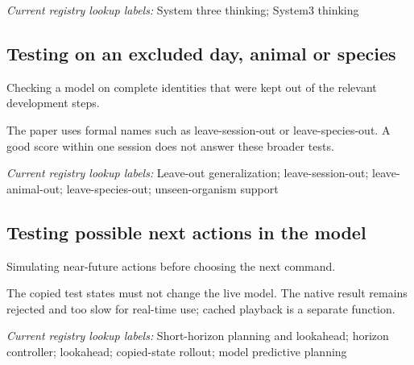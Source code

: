 \noindent\textit{Current registry lookup labels:} System three thinking; System3 thinking\par

\begin{samepage}
\subsection*{Testing on an excluded day, animal or species}
\noindent Checking a model on complete identities that were kept out of the relevant development steps.\par
\end{samepage}
\begin{samepage}
\noindent The paper uses formal names such as leave-session-out or leave-species-out. A good score within one session does not answer these broader tests.\par\nopagebreak[4]

\end{samepage}


\noindent\textit{Current registry lookup labels:} Leave-out generalization; leave-session-out; leave-animal-out; leave-species-out; unseen-organism support\par

\begin{samepage}
\subsection*{Testing possible next actions in the model}
\noindent Simulating near-future actions before choosing the next command.\par
\end{samepage}
\begin{samepage}
\noindent The copied test states must not change the live model. The native result remains rejected and too slow for real-time use; cached playback is a separate function.\par\nopagebreak[4]

\end{samepage}


\noindent\textit{Current registry lookup labels:} Short-horizon planning and lookahead; horizon controller; lookahead; copied-state rollout; model predictive planning\par

